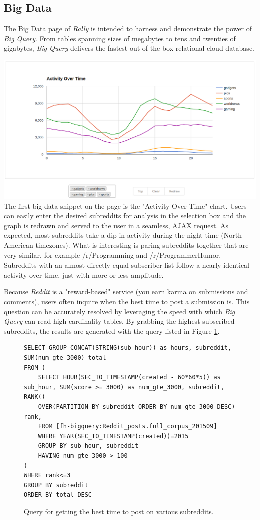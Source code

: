 \documentclass[msc,oneside]{ubcthesis}%
\begin{document}
\subsection{Big Data}
The Big Data page of \textit{Rally} is intended to harness and demonstrate the power of \textit{Big Query}. From tables spanning sizes of megabytes to tens and twenties of gigabytes, \textit{Big Query} delivers the fastest out of the box relational cloud database.
\par
\includegraphics[width=\textwidth]{bigquery.png}
The first big data snippet on the page is the "Activity Over Time" chart. Users can easily enter the desired subreddits for analysis in the selection box and the graph is redrawn and served to the user in a seamless, AJAX request. As expected, most subreddits take a dip in activity during the night-time (North American timezones). What is interesting is paring subreddits together that are very similar, for example /r/Programming and /r/ProgrammerHumor. Subreddits with an almost directly equal subscriber list follow a nearly identical activity over time, just with more or less amplitude.
\par
Because \textit{Reddit} is a "reward-based" service (you earn karma on submissions and comments), users often inquire when the best time to post a submission is. This question can be accurately resolved by leveraging the speed with which \textit{Big Query} can read high cardinality tables. By grabbing the highest subscribed subreddits, the results are generated with the query listed in Figure \ref{fig:besttime}.
\begin{figure}[H]
\begin{center}
\begin{lstlisting}
SELECT GROUP_CONCAT(STRING(sub_hour)) as hours, subreddit, SUM(num_gte_3000) total 
FROM ( 
	SELECT HOUR(SEC_TO_TIMESTAMP(created - 60*60*5)) as sub_hour, SUM(score >= 3000) as num_gte_3000, subreddit, RANK() 
	OVER(PARTITION BY subreddit ORDER BY num_gte_3000 DESC) rank, 
	FROM [fh-bigquery:Reddit_posts.full_corpus_201509] 
	WHERE YEAR(SEC_TO_TIMESTAMP(created))=2015 
	GROUP BY sub_hour, subreddit 
	HAVING num_gte_3000 > 100 
) 
WHERE rank<=3 
GROUP BY subreddit 
ORDER BY total DESC
\end{lstlisting}
\end{center}
\caption[Query for getting the best time to post on various subreddits]{
Query for getting the best time to post on various subreddits.}
\label{fig:besttime}
\end{figure}
\end{document}
